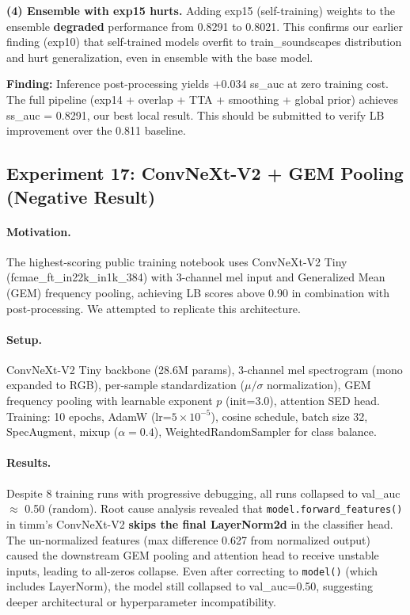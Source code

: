 \textbf{(4) Ensemble with exp15 hurts.}
Adding exp15 (self-training) weights to the ensemble \textbf{degraded}
performance from 0.8291 to 0.8021. This confirms our earlier finding (exp10)
that self-trained models overfit to train\_soundscapes distribution and
hurt generalization, even in ensemble with the base model.

\textbf{Finding:} Inference post-processing yields $+0.034$ ss\_auc at zero
training cost. The full pipeline (exp14 + overlap + TTA + smoothing + global
prior) achieves ss\_auc = 0.8291, our best local result. This should be
submitted to verify LB improvement over the 0.811 baseline.

\subsection{Experiment 17: ConvNeXt-V2 + GEM Pooling (Negative Result)}
\label{sec:exp17}

\paragraph{Motivation.}
The highest-scoring public training notebook uses ConvNeXt-V2 Tiny
(fcmae\_ft\_in22k\_in1k\_384) with 3-channel mel input and Generalized Mean (GEM)
frequency pooling, achieving LB scores above 0.90 in combination with
post-processing. We attempted to replicate this architecture.

\paragraph{Setup.}
ConvNeXt-V2 Tiny backbone (28.6M params), 3-channel mel spectrogram (mono expanded
to RGB), per-sample standardization ($\mu/\sigma$ normalization), GEM frequency
pooling with learnable exponent $p$ (init=3.0), attention SED head.
Training: 10 epochs, AdamW (lr=$5\times10^{-5}$), cosine schedule, batch size 32,
SpecAugment, mixup ($\alpha=0.4$), WeightedRandomSampler for class balance.

\paragraph{Results.}
Despite 8 training runs with progressive debugging, all runs collapsed to
val\_auc $\approx$ 0.50 (random). Root cause analysis revealed that
\texttt{model.forward\_features()} in timm's ConvNeXt-V2 \textbf{skips the final
LayerNorm2d} in the classifier head. The un-normalized features (max difference 0.627
from normalized output) caused the downstream GEM pooling and attention head to
receive unstable inputs, leading to all-zeros collapse. Even after correcting to
\texttt{model()} (which includes LayerNorm), the model still collapsed to val\_auc=0.50,
suggesting deeper architectural or hyperparameter incompatibility.

